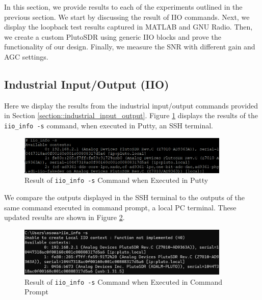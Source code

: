 \documentclass{article}
\begin{document}
In this section, we provide results to each of the experiments outlined in the previous section. We start by discussing the result of IIO commands. Next, we display the loopback test results captured in MATLAB and GNU Radio. Then, we create a custom PlutoSDR using generic IIO blocks and prove the functionality of our design. Finally, we measure the SNR with different gain and AGC settings.

\subsection{Industrial Input/Output (IIO)}

Here we display the results from the industrial input/output commands provided in Section \ref{section::industrial_input_output}. Figure \ref{fig::iio_info_putty} displays the results of the \texttt{iio\_info -s} command, when executed in Putty, an SSH terminal.  

\begin{figure}[H]
	\centerline{\includegraphics[width=0.9\textwidth]{iio_info_putty.png}}
	\caption{Result of \texttt{iio\_info -s} Command when Executed in Putty}
	\label{fig::iio_info_putty}
\end{figure}

We compare the outputs displayed in the SSH terminal to the outputs of the same command executed in command prompt, a local PC terminal. These updated results are shown in Figure \ref{fig::iio_info_cmd}.

\begin{figure}[H]
	\centerline{\includegraphics[width=0.9\textwidth]{iio_info_cmd.png}}
	\caption{Result of \texttt{iio\_info -s} Command when Executed in Command Prompt}
	\label{fig::iio_info_cmd}
\end{figure}
\end{document}
